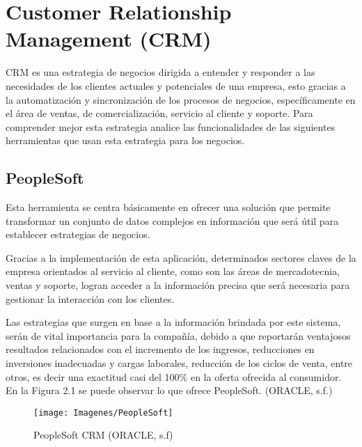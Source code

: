     \section{Customer Relationship Management (CRM)}
    CRM es una estrategia de negocios dirigida a entender y responder a las necesidades de los clientes actuales y potenciales de una empresa, esto gracias a la automatización y sincronización de los procesos de negocios, específicamente en el área de ventas, de comercialización, servicio al cliente y soporte. Para comprender mejor esta estrategia analice las funcionalidades de las siguientes herramientas que usan esta estrategia para los negocios.
    
	    \subsection{PeopleSoft}
	    Esta herramienta se centra básicamente en ofrecer una solución que permite transformar un conjunto de datos complejos en información que será útil para establecer estrategias de negocios.
	    \newline
	    \par
	    Gracias a la implementación de esta aplicación, determinados sectores claves de la empresa orientados al servicio al cliente, como son las áreas de mercadotecnia, ventas y soporte, logran acceder a la información precisa que será necesaria para gestionar la interacción con los clientes.
	    \newline
	    \par
	    Las estrategias que surgen en base a la información brindada por este sistema, serán de vital importancia para la compañía, debido a que reportarán ventajosos resultados relacionados con el incremento de los ingresos, reducciones en inversiones inadecuadas y cargas laborales, reducción de los ciclos de venta, entre otros, es decir una exactitud casi del 100$\%$ en la oferta ofrecida al consumidor. En la Figura 2.1 se puede observar lo que ofrece PeopleSoft. (ORACLE, s.f.)
	    \newline
	    
	    \begin{figure}[H]
	    	\centering
	    	\texttt{[image: Imagenes/PeopleSoft]}
	    	\caption{PeopleSoft CRM (ORACLE, s.f)}
	    \end{figure}
	    
